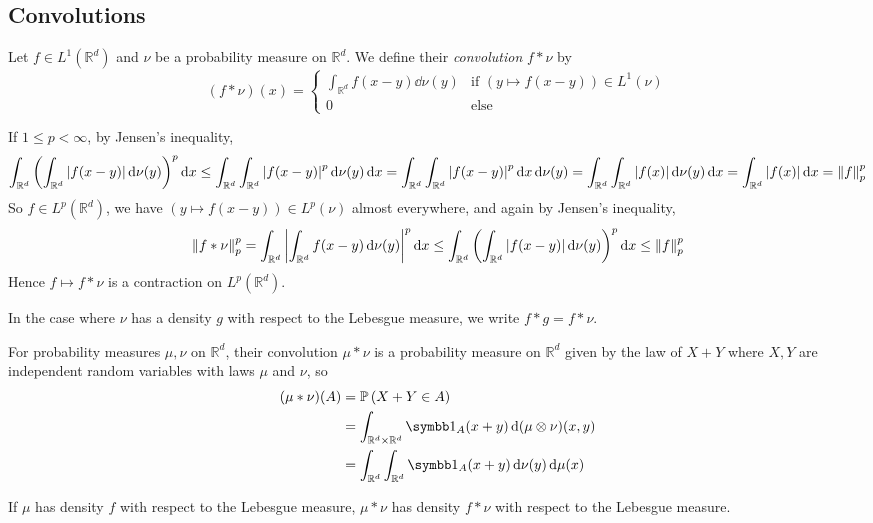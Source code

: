 \subsection{Convolutions}
\begin{definition}
	Let \( f \in L^1(\mathbb R^d) \) and \( \nu \) be a probability measure on \( \mathbb R^d \).
	We define their \emph{convolution} \( f \ast \nu \) by
	\[ (f \ast \nu)(x) = \begin{cases}
		\int_{\mathbb R^d} f(x-y) \dd{\nu(y)} & \text{if } (y \mapsto f(x-y)) \in L^1(\nu) \\
		0 & \text{else}
	\end{cases} \]
\end{definition}
\begin{remark}
	If \( 1 \leq p < \infty \), by Jensen's inequality,
	\[ \int_{\mathbb R^d} \qty( \int_{\mathbb R^d} \abs{f(x-y)} \dd{\nu(y)} )^p \dd{x} \leq \int_{\mathbb R^d} \int_{\mathbb R^d} \abs{f(x-y)}^p \dd{\nu(y)} \dd{x} = \int_{\mathbb R^d} \int_{\mathbb R^d} \abs{f(x-y)}^p \dd{x} \dd{\nu(y)} = \int_{\mathbb R^d} \int_{\mathbb R^d} \abs{f(x)} \dd{\nu(y)} \dd{x} = \int_{\mathbb R^d} \abs{f(x)} \dd{x} = \norm{f}_p^p \]
	So \( f \in L^p(\mathbb R^d) \), we have \( (y \mapsto f(x-y)) \in L^p(\nu) \) almost everywhere, and again by Jensen's inequality,
	\[ \norm{f \ast \nu}_p^p = \int_{\mathbb R^d} \abs{ \int_{\mathbb R^d} f(x-y)\dd{\nu(y)} }^p \dd{x} \leq \int_{\mathbb R^d} \qty( \int_{\mathbb R^d} \abs{f(x-y)} \dd{\nu(y)} )^p \dd{x} \leq \norm{f}_p^p \]
	Hence \( f \mapsto f \ast \nu \) is a contraction on \( L^p(\mathbb R^d) \).
\end{remark}
In the case where \( \nu \) has a density \( g \) with respect to the Lebesgue measure, we write \( f \ast g = f \ast \nu \).
\begin{definition}
	For probability measures \( \mu, \nu \) on \( \mathbb R^d \), their convolution \( \mu \ast \nu \) is a probability measure on \( \mathbb R^d \) given by the law of \( X + Y \) where \( X, Y \) are independent random variables with laws \( \mu \) and \( \nu \), so
	\begin{align*}
		(\mu \ast \nu)(A) &= \prob{X+Y \in A} \\
		&= \int_{\mathbb R^d \times \mathbb R^d} \symbb 1_A(x+y) \dd{(\mu \otimes \nu)(x, y)} \\
		&= \int_{\mathbb R^d} \int_{\mathbb R^d} \symbb 1_A(x+y) \dd{\nu(y)} \dd{\mu(x)}
	\end{align*}
\end{definition}
If \( \mu \) has density \( f \) with respect to the Lebesgue measure, \( \mu \ast \nu \) has density \( f \ast \nu \) with respect to the Lebesgue measure.
